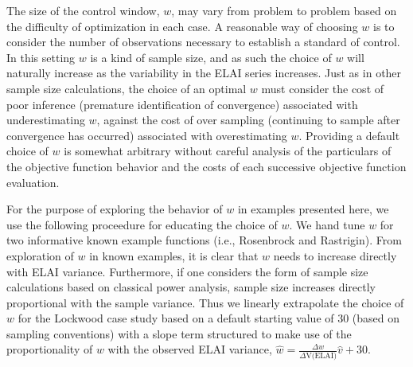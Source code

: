 \documentclass{article}
\begin{document}
%
The size of the control window, $w$, may vary from problem to problem based on 
the difficulty of optimization in each case. A reasonable way of choosing $w$ 
is to consider the number of observations necessary to establish a standard of 
control. In this setting $w$ is a kind of sample size, and as such the 
choice of $w$ will naturally increase as the variability in the ELAI series 
increases. Just as in other sample size calculations, the choice of an optimal 
$w$ must consider the cost of poor inference (premature identification of 
convergence) associated with underestimating $w$, against the cost of over 
sampling (continuing to sample after convergence has occurred) associated with 
overestimating $w$. Providing a default choice of $w$ is somewhat arbitrary 
without careful analysis of the particulars of the objective function behavior 
and the costs of each successive objective function evaluation. 

%
For the purpose of exploring the behavior of $w$ in examples presented here, 
we use the following proceedure for educating the choice of $w$. We hand tune 
$w$ for two informative known example functions (i.e., Rosenbrock and 
Rastrigin). From exploration of $w$ in known examples, it is clear that $w$ 
needs to increase directly with ELAI variance. Furthermore, if one considers the form 
of sample size calculations based on classical power analysis, sample size 
increases directly proportional with the sample variance. Thus we linearly 
extrapolate the choice of $w$ for the Lockwood case study based on a default 
starting value of 30 (based on sampling conventions) with a slope term 
structured to make use of the proportionality of $w$ with the observed ELAI 
variance, $\hat w=\frac{\Delta w}{\Delta \text{V(ELAI)}}\hat v+30$. %

% 
% 
% 
\end{document}
